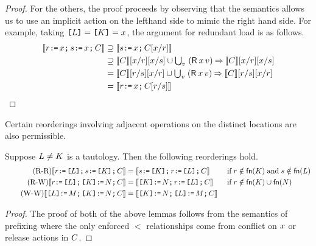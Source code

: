 \begin{lemma}
\begin{proof}
  For the others, the proof proceeds by observing that the semantics allows us
  to use an implicit action on the lefthand side to mimic the right hand side.
  For example, taking $\texttt{[}L\texttt{]}=\texttt{[}K\texttt{]}=x$, the argument for
  redundant load is as follows.
  \begin{align*}
    \sem{\aReg \GETS \aLoc \SEMI \bReg \GETS \aLoc  \SEMI \aCmd} 
    &\supseteq  \sem{ \bReg  \GETS \aLoc \SEMI \aCmd[\aLoc/\aReg]} \\
    &\supseteq  \sem{\aCmd}[\aLoc/\aReg][\aLoc/\bReg] \cup  \textstyle\bigcup_\aVal\;  (\DR\aLoc\aVal) \prefix \sem{\aCmd}[\aLoc/\aReg][\aLoc/\bReg]\\
    &= \sem{\aCmd}[\aReg/ \bReg][\aLoc/\aReg] \cup  \textstyle\bigcup_\aVal\;  (\DR\aLoc\aVal) \prefix \sem{\aCmd}[\aReg/ \bReg][\aLoc/\aReg]\\
    &= \sem{\aReg \GETS \aLoc\SEMI \aCmd[\aReg/\bReg]}
    \tag*{\qedhere}
  \end{align*}
\end{proof}
\end{lemma}

  
Certain reorderings involving adjacent operations on the distinct locations
are also permissible. 

\begin{lemma}%
  Suppose $L\neq K$ is a tautology.  Then the following reorderings hold.
  \begin{align*}
    \tag{R-R}
    \llbracket r \texttt{:}\mkern-1mu\texttt{=}\, \texttt{[}L\texttt{]} \texttt{;}\,\allowbreak s \texttt{:}\mkern-1mu\texttt{=}\, \texttt{[}K\texttt{]} \texttt{;}\,\allowbreak C\rrbracket &=
    \llbracket s \texttt{:}\mkern-1mu\texttt{=}\, \texttt{[}K\texttt{]} \texttt{;}\,\allowbreak r \texttt{:}\mkern-1mu\texttt{=}\, \texttt{[}L\texttt{]} \texttt{;}\,\allowbreak C\rrbracket
    &&\;\allowbreak\text{if}\allowbreak\; r\notin\mathsf{fn}(K) \;\allowbreak\text{and}\allowbreak\; s\notin\mathsf{fn}(L)
    \\
    \tag{R-W}
    \llbracket r \texttt{:}\mkern-1mu\texttt{=}\, \texttt{[}L\texttt{]} \texttt{;}\,\allowbreak \texttt{[}K\texttt{]} \texttt{:}\mkern-1mu\texttt{=}\, N \texttt{;}\,\allowbreak C\rrbracket &=
    \llbracket\texttt{[}K\texttt{]} \texttt{:}\mkern-1mu\texttt{=}\, N \texttt{;}\,\allowbreak r \texttt{:}\mkern-1mu\texttt{=}\, \texttt{[}L\texttt{]} \texttt{;}\,\allowbreak C\rrbracket
    &&\;\allowbreak\text{if}\allowbreak\; r\notin\mathsf{fn}(K) \cup\mathsf{fn}(N)
    \\
    \tag{W-W}
    \llbracket\texttt{[}L\texttt{]} \texttt{:}\mkern-1mu\texttt{=}\, M \texttt{;}\,\allowbreak \texttt{[}K\texttt{]} \texttt{:}\mkern-1mu\texttt{=}\, N \texttt{;}\,\allowbreak C\rrbracket &=
    \llbracket\texttt{[}K\texttt{]} \texttt{:}\mkern-1mu\texttt{=}\, N \texttt{;}\,\allowbreak \texttt{[}L\texttt{]} \texttt{:}\mkern-1mu\texttt{=}\, M \texttt{;}\,\allowbreak C\rrbracket
  \end{align*}
\begin{proof}
The proof of both of the above lemmas follows from the semantics of prefixing where the only enforced $\lt$ relationships come from conflict on $x$ or release actions in $C$.
\end{proof}
\end{lemma}

